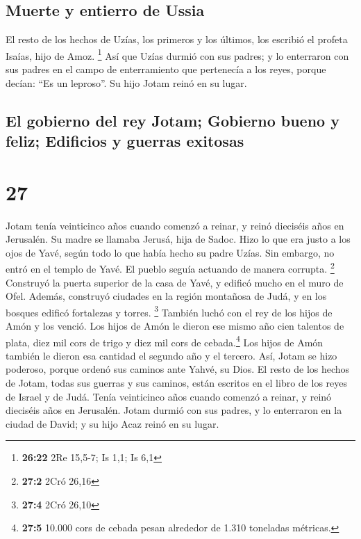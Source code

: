 \hypertarget{muerte-y-entierro-de-ussia}{%
\subsection{Muerte y entierro de
Ussia}\label{muerte-y-entierro-de-ussia}}

 El resto de los hechos de Uzías, los primeros y los
últimos, los escribió el profeta Isaías, hijo de Amoz. \footnote{\textbf{26:22}
  2Re 15,5-7; Is 1,1; Is 6,1}  Así que Uzías durmió con
sus padres; y lo enterraron con sus padres en el campo de enterramiento
que pertenecía a los reyes, porque decían: ``Es un leproso''. Su hijo
Jotam reinó en su lugar.

\hypertarget{el-gobierno-del-rey-jotam-gobierno-bueno-y-feliz-edificios-y-guerras-exitosas}{%
\subsection{El gobierno del rey Jotam; Gobierno bueno y feliz; Edificios
y guerras
exitosas}\label{el-gobierno-del-rey-jotam-gobierno-bueno-y-feliz-edificios-y-guerras-exitosas}}

\hypertarget{section-26}{%
\section{27}\label{section-26}}

 Jotam tenía veinticinco años cuando comenzó a reinar, y
reinó dieciséis años en Jerusalén. Su madre se llamaba Jerusá, hija de
Sadoc.  Hizo lo que era justo a los ojos de Yavé, según
todo lo que había hecho su padre Uzías. Sin embargo, no entró en el
templo de Yavé. El pueblo seguía actuando de manera corrupta.
\footnote{\textbf{27:2} 2Cró 26,16}  Construyó la puerta
superior de la casa de Yavé, y edificó mucho en el muro de Ofel.
 Además, construyó ciudades en la región montañosa de
Judá, y en los bosques edificó fortalezas y torres. \footnote{\textbf{27:4}
  2Cró 26,10}  También luchó con el rey de los hijos de
Amón y los venció. Los hijos de Amón le dieron ese mismo año cien
talentos de plata, diez mil cors de trigo y diez mil cors de
cebada.\footnote{\textbf{27:5} 10.000 cors de cebada pesan alrededor de
  1.310 toneladas métricas.} Los hijos de Amón también le dieron esa
cantidad el segundo año y el tercero.  Así, Jotam se hizo
poderoso, porque ordenó sus caminos ante Yahvé, su Dios. 
El resto de los hechos de Jotam, todas sus guerras y sus caminos, están
escritos en el libro de los reyes de Israel y de Judá. 
Tenía veinticinco años cuando comenzó a reinar, y reinó dieciséis años
en Jerusalén.  Jotam durmió con sus padres, y lo
enterraron en la ciudad de David; y su hijo Acaz reinó en su lugar.

